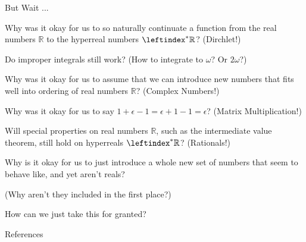 \documentclass{beamer}
\newcommand{\ls}{\leftindex^*}
\newcommand{\RR}{\mathbb{R}}
\newcommand{\HR}{\ls{\RR}}
\begin{document}
\begin{frame}{But Wait ...} \pause

    Why was it okay for us to so naturally continuate a function from the real numbers \(\RR\) to the hyperreal numbers \(\HR\)? \pause (Dirchlet!) \pause

    Do improper integrals still work? \pause (How to integrate to \(\omega\)? \pause Or \(2\omega\)?)\pause

    \vspace{1pt}

    \large

    Why was it okay for us to assume that we can introduce new numbers that fits well into ordering of real numbers \(\RR\)? \pause \normalsize (Complex Numbers!) \pause

    \vspace{1pt}

    \large

    Why was it okay for us to say \(1 + \epsilon - 1 = \epsilon + 1 - 1 = \epsilon\)? \pause \normalsize (Matrix Multiplication!) \pause

    \vspace{1pt}

    \large

    Will special properties on real numbers \(\RR\), such as the intermediate value theorem, still hold on hyperreals \(\HR\)? \pause \normalsize (Rationals!) \pause

    \vspace{1pt}

    \Large
    
    Why is it okay for us to just introduce a whole new set of numbers that seem to behave like, and yet aren't reals? \pause
    
    \normalsize
    (Why aren't they included in the first place?) \pause

    \vspace{1pt}

    \LARGE How can we just take this for granted?
\end{frame}

\begin{frame}{References}
    \printbibliography
\end{frame}
\end{document}
